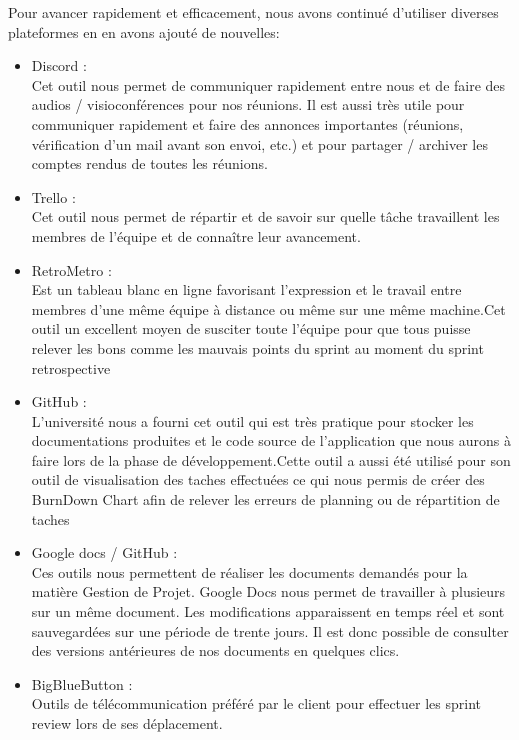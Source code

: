Pour avancer rapidement et efficacement, nous avons
continué d’utiliser diverses plateformes en en avons ajouté de nouvelles:\newline

\begin{itemize}
	\item Discord :\\
	Cet outil nous permet de communiquer rapidement entre nous et
    de faire des audios / visioconférences pour nos réunions. Il est aussi très utile
    pour communiquer rapidement et faire des annonces importantes (réunions,
    vérification d’un mail avant son envoi, etc.) et pour partager / archiver les
    comptes rendus de toutes les réunions.\\
	
    \item Trello :\\
	Cet outil nous permet de répartir et de savoir sur quelle tâche
    travaillent les membres de l’équipe et de connaître leur avancement.\\
    
    \item RetroMetro :\\
    Est un tableau blanc en ligne favorisant l’expression et le travail entre membres d’une même équipe 
    à distance ou même sur une même machine.Cet outil un excellent moyen de susciter toute l'équipe pour
    que tous puisse relever les bons comme les mauvais points du sprint au moment du sprint retrospective\\

    \item GitHub :\\
	L’université nous a fourni cet outil qui est très pratique pour stocker
    les documentations produites et le code source de l’application que nous
    aurons à faire lors de la phase de développement.Cette outil a aussi été utilisé pour son outil de visualisation des taches effectuées
		ce qui nous permis de créer des BurnDown Chart afin de relever les erreurs de planning ou de répartition de taches\\
	
    \item Google docs / GitHub :\\
	Ces outils nous permettent de réaliser les documents demandés
    pour la matière Gestion de Projet. Google Docs nous permet de travailler à
    plusieurs sur un même document. Les modifications apparaissent en temps
    réel et sont sauvegardées sur une période de trente jours. Il est donc possible
    de consulter des versions antérieures de nos documents en quelques clics.\\

		\item BigBlueButton :\\
		Outils de télécommunication préféré par le client pour effectuer les sprint review lors de ses déplacement.	


\end{itemize}

